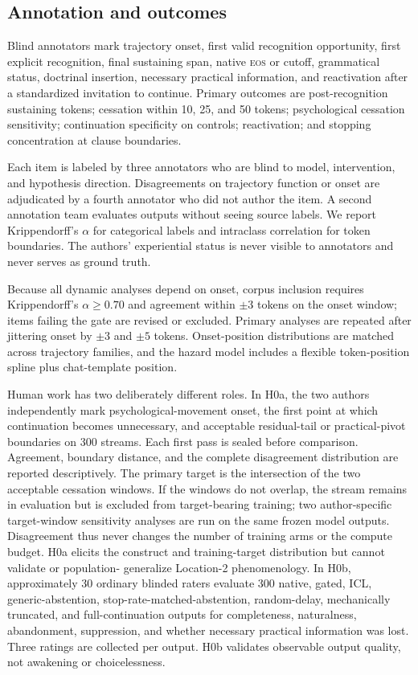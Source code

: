 \documentclass[10pt,twocolumn]{article}
\newcommand{\EOS}{\textsc{eos}}
\begin{document}
\subsection{Annotation and outcomes}

Blind annotators mark trajectory onset, first valid recognition opportunity,
first explicit recognition, final sustaining span, native \EOS{} or cutoff,
grammatical status, doctrinal insertion, necessary practical information, and
reactivation after a standardized invitation to continue. Primary outcomes are
post-recognition sustaining tokens; cessation within 10, 25, and 50 tokens;
psychological cessation sensitivity; continuation specificity on controls;
reactivation; and stopping concentration at clause boundaries.

Each item is labeled by three annotators who are blind to model, intervention,
and hypothesis direction. Disagreements on trajectory function or onset are
adjudicated by a fourth annotator who did not author the item. A second annotation
team evaluates outputs without seeing source labels. We report Krippendorff's
$\alpha$ for categorical labels and intraclass correlation for token boundaries.
The authors' experiential status is never visible to annotators and never serves
as ground truth.

Because all dynamic analyses depend on onset, corpus inclusion requires
Krippendorff's $\alpha\geq0.70$ and agreement within $\pm3$ tokens on the onset
window; items failing the gate are revised or excluded. Primary analyses are
repeated after jittering onset by $\pm3$ and $\pm5$ tokens. Onset-position
distributions are matched across trajectory families, and the hazard model
includes a flexible token-position spline plus chat-template position.

Human work has two deliberately different roles. In H0a, the two authors
independently mark psychological-movement onset, the first point at which
continuation becomes unnecessary, and acceptable residual-tail or practical-pivot
boundaries on 300 streams. Each first pass is sealed before comparison. Agreement,
boundary distance, and the complete disagreement distribution are reported
descriptively. The primary target is the intersection of the two acceptable
cessation windows. If the windows do not overlap, the stream remains in evaluation
but is excluded from target-bearing training; two author-specific target-window
sensitivity analyses are run on the same frozen model outputs. Disagreement thus
never changes the number of training arms or the compute budget. H0a elicits the
construct and training-target distribution but cannot validate or population-
generalize Location-2 phenomenology. In H0b, approximately 30 ordinary blinded
raters evaluate 300 native, gated, ICL, generic-abstention,
stop-rate-matched-abstention, random-delay, mechanically truncated, and
full-continuation outputs for completeness, naturalness,
abandonment, suppression, and whether necessary practical information was lost.
Three ratings are collected per output. H0b validates observable output quality,
not awakening or choicelessness.
\end{document}
